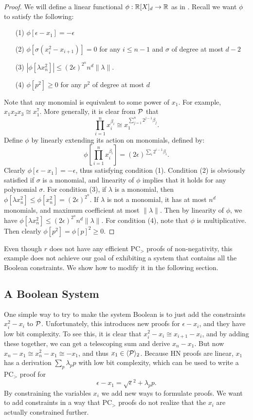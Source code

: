 \begin{proof}
We will define a linear functional $\phi: \mathbb R[X]_d \rightarrow \mathbb R$ as in . Recall we want $\phi$ to satisfy the following:
\begin{enumerate}
\item[(1)] $\phi[\epsilon - x_1] = -\epsilon$
\item[(2)] $\phi[\sigma(x_i^2 - x_{i+1})] = 0$ for any $i \leq n-1$ and $\sigma$ of degree at most $d-2$
\item[(3)] $|\phi[\lambda x_n^2]| \leq (2\epsilon)^{2^{n}}n^d\|\lambda\|$.
\item[(4)] $\phi[p^2] \geq 0$ for any $p^2$ of degree at most $d$
\end{enumerate}

Note that any monomial is equivalent to some power of $x_1$. For example, $x_1x_2x_3 \cong x_1^7$.  More generally, it is clear from $\mathcal P$ that 
\[\prod_{i = 1}^n x_i^{\beta_i} \cong x_1^{\sum_{j = 1}^n 2^{j-1} \beta_j}.\] 
Define $\phi$ by linearly extending its action on monomials, defined by:
\[\phi\left[ \prod_{i = 1}^n x_i^{\beta_i}\right] = (2\epsilon)^{\sum_{i} 2^{i-1} \beta_i }. \]
Clearly $\phi[\epsilon - x_1] = -\epsilon$, thus satisfying condition (1). Condition (2) is obviously satisfied if $\sigma$ is a monomial, and linearity of $\phi$ implies that it holds for any polynomial $\sigma$. For condition (3), if $\lambda$ is a monomial, then $\phi[\lambda x_n^2] \leq \phi[x_n^2] = (2\epsilon)^{2^{n}}$. If $\lambda$ is not a monomial, it has at most $n^d$ monomials, and maximum coefficient at most $\|\lambda\|$. Then by linearity of $\phi$, we have $\phi[\lambda x_n^2] \leq (2\epsilon)^{2^n}n^d\|\lambda\|$. For condition (4), note that $\phi$ is multiplicative. Then clearly $\phi[p^2] = \phi[p]^2 \geq 0$. 
\end{proof}

Even though $r$ does not have any efficient PC$_>$ proofs of non-negativity, this example does not achieve our goal of exhibiting a system that contains all the Boolean constraints. We show how to modify it in the following section.

\subsection{A Boolean System}
One simple way to try to make the system Boolean is to just add the constraints $x_i^2 - x_i$ to $\mathcal P$. Unfortunately, this introduces new proofs for $\epsilon - x_i$, and they have low bit complexity. To see this, it is clear that $x_i^2 - x_i \cong x_{i+1} - x_i$, and by adding these together, we can get a telescoping sum and derive $x_n - x_1$. But now $x_n - x_1 \cong x_n^2 - x_1 \cong -x_1$, and thus $x_1 \in \langle \mathcal P \rangle_2$. Because HN proofs are linear, $x_1$ has a derivation $\sum_p \lambda_p p$ with low bit complexity, which can be used to write a PC$_>$ proof for 
\[\epsilon - x_1 = \sqrt{\epsilon}^2 + \lambda_p p.\]
By constraining the variables $x_i$ we add new ways to formulate proofs. We want to add constraints in a way that PC$_>$ proofs do not realize that the $x_i$ are actually constrained further.

